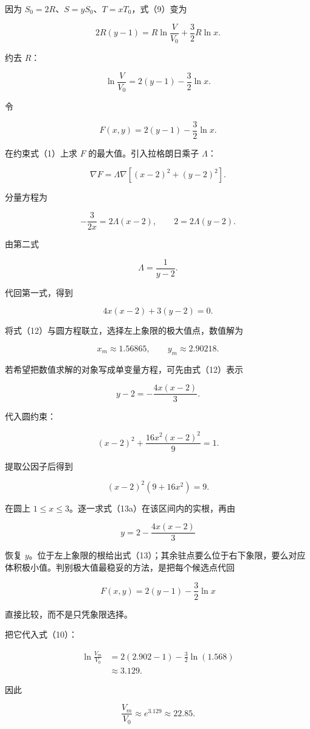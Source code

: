 \documentclass[12pt,a4paper,UTF8]{ctexart}
\begin{document}
因为 \(S_0=2R\)、\(S=yS_0\)、\(T=xT_0\)，式（9）变为

\[2R(y-1)=R\ln\frac{V}{V_0}+\frac32R\ln x.\]

约去 \(R\)：

\[\ln\frac{V}{V_0}=2(y-1)-\frac32\ln x. \tag{10}\]

令

\[F(x,y)=2(y-1)-\frac32\ln x.\]

在约束式（1）上求 \(F\) 的最大值。引入拉格朗日乘子 \(\Lambda\)：

\[\nabla F=\Lambda\nabla[(x-2)^2+(y-2)^2].\]

分量方程为

\[-\frac{3}{2x}=2\Lambda(x-2),\qquad
2=2\Lambda(y-2). \tag{11}\]

由第二式

\[\Lambda=\frac1{y-2}.\]

代回第一式，得到

\[4x(x-2)+3(y-2)=0. \tag{12}\]

将式（12）与圆方程联立，选择左上象限的极大值点，数值解为

\[x_m\approx1.56865,\qquad y_m\approx2.90218. \tag{13}\]

若希望把数值求解的对象写成单变量方程，可先由式（12）表示

\[y-2=-\frac{4x(x-2)}{3}.\]

代入圆约束：

\[ (x-2)^2+\frac{16x^2(x-2)^2}{9}=1.\]

提取公因子后得到

\[ (x-2)^2(9+16x^2)=9. \tag{13a}\]

在圆上 \(1\leq x\leq3\)。逐一求式（13a）在该区间内的实根，再由

\[y=2-\frac{4x(x-2)}{3}\]

恢复
\(y\)。位于左上象限的根给出式（13）；其余驻点要么位于右下象限，要么对应体积极小值。判别极大值最稳妥的方法，是把每个候选点代回

\[F(x,y)=2(y-1)-\frac32\ln x\]

直接比较，而不是只凭象限选择。

把它代入式（10）：

\[\begin{aligned}
\ln\frac{V_m}{V_0}
&=2(2.902-1)-\frac32\ln(1.568)\\
&\approx3.129.
\end{aligned}\]

因此

\[\boxed{\frac{V_m}{V_0}\approx e^{3.129}\approx22.85}. \tag{14}\]
\end{document}
